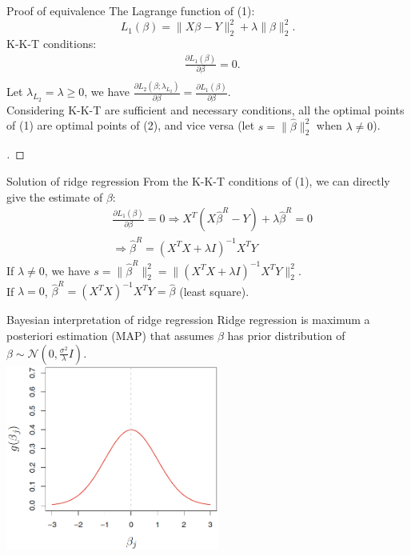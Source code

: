 \documentclass{beamer}
\begin{document}
	\begin{frame}{Proof of equivalence}
		The Lagrange function of (1):
		\[
		L_1(\beta)=\|X\beta-Y\|_2^2+\lambda\|\beta\|_2^2.
		\]
		K-K-T conditions:
		\begin{align*}
			&\frac{\partial L_1(\beta)}{\partial \beta}=0. \\
		\end{align*}
		Let $\lambda_{L_2}=\lambda \geq 0$, we have $\frac{\partial L_2(\beta;\lambda_{L_2})}{\partial \beta} = \frac{\partial L_1(\beta)}{\partial \beta}$. \\
		Considering K-K-T are sufficient and necessary conditions, all the optimal points of (1) are optimal points of (2), and vice versa (let $s=\|\hat{\beta}\|_2^2$ when $\lambda\ne0$).
		\begin{proof}[\unskip\nopunct]\end{proof}
	\end{frame}

	\begin{frame}{Solution of ridge regression}
		From the K-K-T conditions of (1), we can directly give the estimate of $\beta$:
		\begin{align*}
			&\frac{\partial L_1(\beta)}{\partial \beta}=0 \Rightarrow X^T(X\hat{\beta}^R-Y)+\lambda \hat{\beta}^R=0 \\
			&\Rightarrow \hat{\beta}^R=(X^TX+\lambda I)^{-1}X^TY
		\end{align*}
		If $\lambda \ne 0$, we have $s=\|\hat{\beta}^R\|_2^2=\|(X^TX+\lambda I)^{-1}X^TY\|_2^2$. \\
		If $\lambda=0$, $\hat{\beta}^R=(X^TX)^{-1}X^TY=\hat{\beta}$ (least square).
	\end{frame}
	
	\begin{frame}{Bayesian interpretation of ridge regression}
		Ridge regression is maximum a posteriori estimation (MAP) that assumes $\beta$ has prior distribution of $\beta \sim \mathcal{N}(0, \frac{\sigma^2}{\lambda} I)$. \\
		\vspace{0.5cm}
		\includegraphics[width=7cm]{figure_6.11_1.png}
	\end{frame}
	
\end{document}

